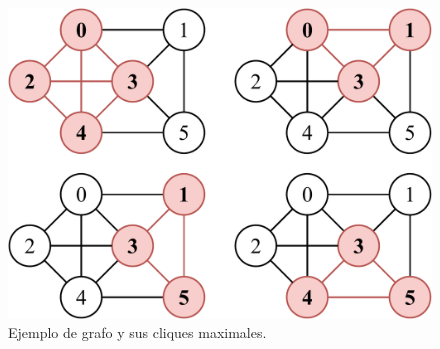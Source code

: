 \begin{figure}
    	\centering
    	\includegraphics[width=0.5\linewidth]{img/maxCliqueExample.pdf}
    	
    \caption{Ejemplo de grafo y sus cliques maximales.}
    \label{fig:maxCliqueExample}
\end{figure}
